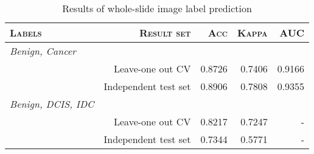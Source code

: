 
    \begin{table}[h]
    \renewcommand{\arraystretch}{1.1}
    \caption{Results of whole-slide image label prediction}
    \label{table_results_stacked}
    \centering
    \begin{tabular}{|lrrrr|}
    \hline
    \textsc{Labels}&\textsc{Result set}&\textsc{Acc}&\textsc{Kappa}&\textsc{AUC}\\
    \hline
    \textit{Benign, Cancer}&&&&\\
    &Leave-one out CV&0.8726&0.7406&0.9166 \\
    &Independent test set&0.8906&0.7808&0.9355 \\
    \textit{Benign, DCIS, IDC}&&&&\\
    &Leave-one out CV&0.8217&0.7247&- \\
    &Independent test set&0.7344&0.5771&- \\
    \hline

    \end{tabular}
    \end{table}

    